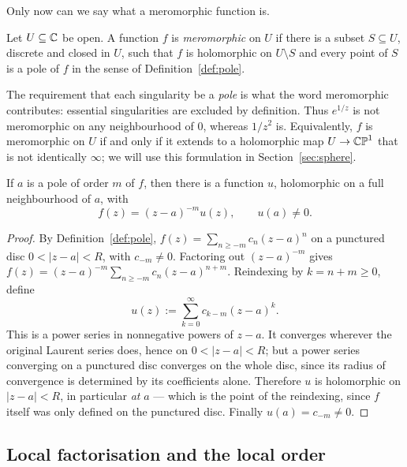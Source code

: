 Only now can we say what a meromorphic function is.

\begin{definition}\label{def:mero}
Let $U \subseteq \mathbb{C}$ be open. A function $f$ is \emph{meromorphic} on $U$ if
there is a subset $S \subseteq U$, discrete and closed in $U$, such that $f$ is
holomorphic on $U \setminus S$ and every point of $S$ is a pole of $f$ in the
sense of Definition~\ref{def:pole}.
\end{definition}

\begin{remark}
The requirement that each singularity be a \emph{pole} is what the word
meromorphic contributes: essential singularities are excluded by definition.
Thus $e^{1/z}$ is not meromorphic on any neighbourhood of $0$, whereas $1/z^2$
is. Equivalently, $f$ is meromorphic on $U$ if and only if it extends to a
holomorphic map $U \to \mathbb{CP}^1$ that is not identically $\infty$; we will use this
formulation in Section~\ref{sec:sphere}.
\end{remark}

\begin{smjproposition}\label{prop:polefact}
If $a$ is a pole of order $m$ of $f$, then there is a function $u$, holomorphic
on a full neighbourhood of $a$, with
\[
f(z) = (z-a)^{-m} u(z), \qquad u(a) \neq 0 .
\]
\end{smjproposition}

\begin{proof}
By Definition~\ref{def:pole}, $f(z) = \sum_{n \geq -m} c_n (z-a)^n$ on a
punctured disc $0 < |z-a| < R$, with $c_{-m} \neq 0$. Factoring out
$(z-a)^{-m}$ gives $f(z) = (z-a)^{-m} \sum_{n \geq -m} c_n (z-a)^{n+m}$.
Reindexing by $k = n+m \geq 0$, define
\[
u(z) := \sum_{k=0}^{\infty} c_{k-m}(z-a)^{k}.
\]
This is a power series in nonnegative powers of $z-a$. It converges wherever the
original Laurent series does, hence on $0 < |z-a| < R$; but a power series
converging on a punctured disc converges on the whole disc, since its radius of
convergence is determined by its coefficients alone. Therefore $u$ is holomorphic
on $|z-a| < R$, in particular \emph{at} $a$ --- which is the point of the
reindexing, since $f$ itself was only defined on the punctured disc. Finally
$u(a) = c_{-m} \neq 0$.
\end{proof}

\subsection{Local factorisation and the local order}

